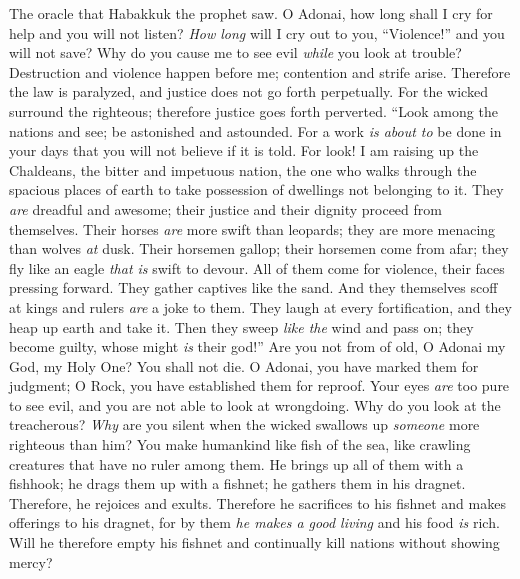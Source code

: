 
\begin{biblechapter} %
 The oracle that Habakkuk the prophet saw.
\verse O Adonai, how long shall I cry for help 
and you will not listen? 
\textit{How long} will I cry out to you, “Violence!” 
and you will not save?
\verse Why do you cause me to see evil 
\textit{while} you look at trouble? 
Destruction and violence happen before me; 
contention and strife arise.
\verse Therefore the law is paralyzed, 
and justice does not go forth perpetually. 
For the wicked surround the righteous; 
therefore justice goes forth perverted.
 “Look among the nations and see; 
be astonished and astounded. 
For a work \textit{is about to} be done in your days 
that you will not believe if it is told.
\verse For look! I am raising up the Chaldeans, 
the bitter and impetuous nation, 
the one who walks through the spacious places of earth 
to take possession of dwellings not belonging to it.
\verse They \textit{are} dreadful and awesome; 
their justice and their dignity proceed from themselves.
\verse Their horses \textit{are} more swift than leopards; 
they are more menacing than wolves \textit{at} dusk. 
Their horsemen gallop; their horsemen come from afar; 
they fly like an eagle \textit{that is} swift to devour.
\verse All of them come for violence, 
their faces pressing forward. 
They gather captives like the sand.
\verse And they themselves scoff at kings 
and rulers \textit{are} a joke to them. 
They laugh at every fortification, 
and they heap up earth and take it.
\verse Then they sweep \textit{like the} wind and pass on; 
they become guilty, whose might \textit{is} their god!”
 Are you not from of old, 
O Adonai my God, my Holy One? 
You shall not die. 
O Adonai, you have marked them for judgment; 
O Rock, you have established them for reproof.
\verse Your eyes \textit{are} too pure to see evil, 
and you are not able to look at wrongdoing. 
Why do you look at the treacherous? 
\textit{Why} are you silent when the wicked swallows up 
\textit{someone} more righteous than him?
\verse You make humankind like fish of the sea, 
like crawling creatures that have no ruler among them.
\verse He brings up all of them with a fishhook; 
he drags them up with a fishnet; 
he gathers them in his dragnet. 
Therefore, he rejoices and exults.
\verse Therefore he sacrifices to his fishnet 
and makes offerings to his dragnet, 
for by them \textit{he makes a good living} 
and his food \textit{is} rich.
\verse Will he therefore empty his fishnet 
and continually kill nations without showing mercy?
\end{biblechapter}

